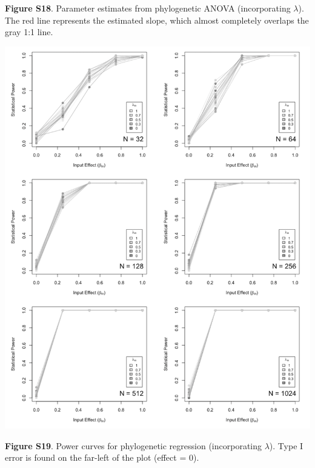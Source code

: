 \documentclass[
]{article}
\begin{document}
\textbf{Figure S18}. Parameter estimates from phylogenetic ANOVA
(incorporating \(\lambda\)). The red line represents the estimated
slope, which almost completely overlaps the gray 1:1 line.

\includegraphics[width=0.95\linewidth]{fig.S19}

\textbf{Figure S19}. Power curves for phylogenetic regression
(incorporating \(\lambda\)). Type I error is found on the far-left of
the plot (effect = 0).
\end{document}
